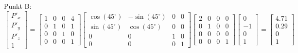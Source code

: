 \documentclass[11pt, a4paper]{article} %
\begin{document}
Punkt B: $\begin{bmatrix}
	P'_x \\ P'_y \\ P'_z \\ 1
\end{bmatrix} = \begin{bmatrix}
	1 & 0 & 0 & 4 \\ 0 & 1 & 0 & 1 \\ 0 & 0 & 1 & 0 \\ 0 & 0 & 0 & 1
\end{bmatrix} \begin{bmatrix}
	\cos(45^\circ) & -\sin(45^\circ) & 0 & 0 \\ \sin(45^\circ) & \cos(45^\circ) & 0 & 0 \\ 0 & 0 & 1 & 0 \\ 0 & 0 & 0 & 1
\end{bmatrix} \begin{bmatrix}
	2 & 0 & 0 & 0 \\ 0 & 1 & 0 & 0 \\ 0 & 0 & 0 & 0 \\ 0 & 0 & 0 & 1
\end{bmatrix} \begin{bmatrix}
	0 \\ -1 \\ 0 \\ 1
\end{bmatrix} = \begin{bmatrix}
	4.71 \\ 0.29 \\ 0 \\ 1
\end{bmatrix}$ \\
\end{document}
